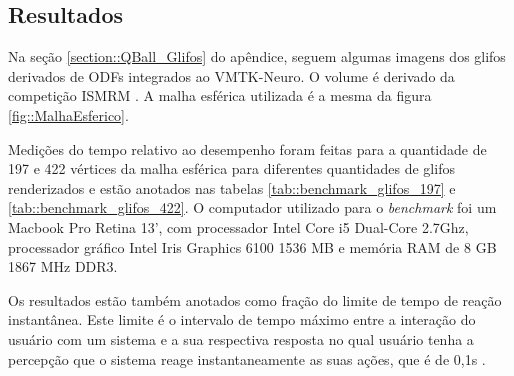 \documentclass[
    12pt,                %
    oneside,            %
    a4paper,            %
    english,            %
    french,                %
    spanish,            %
    brazil                %
    ]{abntex2}
\begin{document}

\subsection{Resultados}


Na seção \ref{section::QBall_Glifos} do apêndice, seguem algumas imagens dos glifos derivados de ODFs integrados ao VMTK-Neuro. O volume é derivado da competição ISMRM \cite{TractometerTool}. A malha esférica utilizada é a mesma da figura \ref{fig::MalhaEsferico}.

Medições do tempo relativo ao desempenho foram feitas para a quantidade de 197 e 422 vértices da malha esférica para diferentes quantidades de glifos renderizados e estão anotados nas tabelas \ref{tab::benchmark_glifos_197} e \ref{tab::benchmark_glifos_422}. O computador utilizado para o \textit{benchmark} foi um Macbook Pro Retina 13', com processador Intel Core i5 Dual-Core 2.7Ghz, processador gráfico Intel Iris Graphics 6100 1536 MB e memória RAM de 8 GB 1867 MHz DDR3.

Os resultados estão também anotados como fração do limite de tempo de reação instantânea. Este limite é o intervalo de tempo máximo entre a interação do usuário com um sistema e a sua respectiva resposta no qual usuário tenha a percepção que o sistema reage instantaneamente as suas ações, que é de 0,1s \cite{nielsen1994}.


\end{document}
